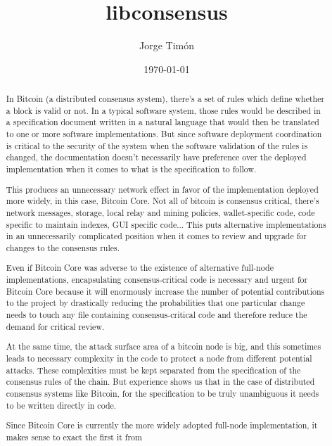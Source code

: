 \documentclass[11pt]{article}
\author{Jorge Timón}
\date{\today}
\title{libconsensus}
\begin{document}
\maketitle
\tableofcontents


\setcounter{secnumdepth}{5}
\setcounter{tocdepth}{5}

\begin{abstract}
In Bitcoin (a distributed consensus system), there's a set of rules
which define whether a block is valid or not. In a typical software
system, those rules would be described in a specification document
written in a natural language that would then be translated to
one or more software implementations. But since software deployment
coordination is critical to the security of the system when the
software validation of the rules is changed, the documentation
doesn't necessarily have preference over the deployed implementation
when it comes to what is the specification to follow.

This produces an unnecessary network effect in favor of the
implementation deployed more widely, in this case, Bitcoin Core. Not
all of bitcoin is consensus critical, there's network messages,
storage, local relay and mining policies, wallet-specific code, code
specific to maintain indexes, GUI specific code...
This puts alternative implementations in an unnecessarily complicated
position when it comes to review and upgrade for changes to the
consensus rules.

Even if Bitcoin Core was adverse to the existence of alternative full-node implementations,
encapsulating consensus-critical code is necessary and urgent for
Bitcoin Core because it will enormously increase the number of potential
contributions to the project by drastically reducing the
probabilities that one particular change needs to touch any file
containing consensus-critical code and therefore reduce the demand for critical review. 

At the same time, the attack surface area of a bitcoin node is big, and
this sometimes leads to necessary complexity in the code to protect a
node from different potential attacks. These complexities must be
kept separated from the specification of the consensus rules of the
chain. 
But experience shows us that in the case of distributed consensus
systems like Bitcoin, for the specification to be truly unambiguous it
needs to be written directly in code.

Since Bitcoin Core is currently the more widely adopted full-node implementation, it makes sense to exact the first it from 
\end{abstract}
\end{document}

